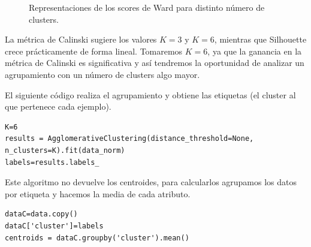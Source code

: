 \documentclass[oneside]{book}
\begin{document}
\begin{figure}[H]
  \centering
  \caption{Representaciones de los scores de Ward para distinto número de clusters.}
  \label{fig:ward1-scores}
\end{figure}

La métrica de Calinski sugiere los valores $K=3$ y $K=6$, mientras que
Silhouette crece prácticamente de forma lineal. Tomaremos $K=6$, ya
que la ganancia en la métrica de Calinski es significativa y así
tendremos la oportunidad de analizar un agrupamiento con un número de
clusters algo mayor.

El siguiente código realiza el agrupamiento y obtiene las etiquetas
(el cluster al que pertenece cada ejemplo).

\begin{verbatim}
K=6
results = AgglomerativeClustering(distance_threshold=None, n_clusters=K).fit(data_norm)
labels=results.labels_
\end{verbatim}

Este algoritmo no devuelve los centroides, para calcularlos agrupamos
los datos por etiqueta y hacemos la media de cada atributo.

\begin{verbatim}
dataC=data.copy()
dataC['cluster']=labels
centroids = dataC.groupby('cluster').mean()
\end{verbatim}
\end{document}
